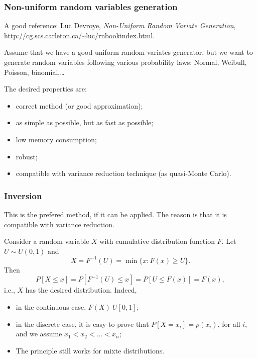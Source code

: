 \documentclass{beamer}
\begin{document}
	\begin{frame}
		\frametitle{Non-uniform random variables generation}
		\label{chap:nonuniform}
		
		A good reference: Luc Devroye, \textsl{Non-Uniform
			Random Variate Generation},
		\url{http://cg.scs.carleton.ca/~luc/rnbookindex.html}.
		
		\mbox{}
		
		Assume that we have a good uniform random variates generator, but we
		want to generate random variables following various probability laws:
		Normal, Weibull, Poisson, binomial,\ldots
		
		\mbox{}
		
		The desired properties are:
		\begin{itemize}
			\item
			correct method (or good approximation);
			\item
			as simple as possible, but as fast as possible;
			\item
			low memory consumption;
			\item
			robust;
			\item
			compatible with variance reduction technique (as quasi-Monte Carlo).
		\end{itemize}
		
	\end{frame}
	
	\begin{frame}
		\frametitle{Inversion}
		
		This is the prefered method, if it can be applied. The reason is that
		it is compatible with variance reduction.
		
		\mbox{}
		
		Consider a random variable $X$ with cumulative distribution function $F$.
		Let $U \sim U (0, 1)$ and
		\[
		X = F^{-1}(U) = \min \lbrace x : F (x)  \geq U \rbrace.
		\]
		Then
		\[
		P [X \leq x] = P [F^{-1}(U) \leq x] = P [U \leq F (x)] = F (x),
		\]
		i.e., $X$ has the desired distribution.
		Indeed,
		\begin{itemize}
			\item
			in the continuous case, $F(X) ~ U[0,1]$;
			\item
			in the discrete case, it is easy to prove that $P[X = x_i] = p(x_i)$,
			for all $i$, and we assume $x_1 < x_2 < \ldots < x_n$;
			\item
			The principle still works for mixte distributions.
		\end{itemize}
		
	\end{frame}
	
\end{document}
